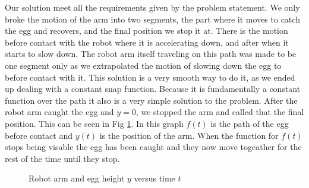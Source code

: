 \documentclass[nofoot,pdf-a,balance,colorlinks,upint,subscriptcorrection,varvw,mathalfa=cal=boondoxo]{asmeconf}
\begin{document}
    Our solution meet all the requirements given by the problem statement. We only broke the motion of the arm into two segments, the part where it moves to catch the egg and recovers, and the final position we stop it at. There is the motion before contact with the robot where it is accelerating down, and after when it starts to slow down. The robot arm itself traveling on this path was made to be one segment only as we extrapolated the motion of slowing down the egg to before contact with it. This solution is a very smooth way to do it, as we ended up dealing with a constant snap function. Because it is fundamentally a constant function over the path it also is a very simple solution to the problem. After the robot arm caught the egg and $\dot{y} = 0$, we stopped the arm and called that the final position. This can be seen in Fig \ref{fig1}. In this graph $f\left(t\right)$ is the path of the egg before contact and $y\left(t\right)$ is the position of the arm. When the function for $f\left(t\right)$ stops being visable the egg has been caught and they now move togeather for the rest of the time until they stop. \newline

    \begin{figure}[H]
        \caption{Robot arm and egg height $y$ versus time $t$}\label{fig1}
    \end{figure}
\end{document}

